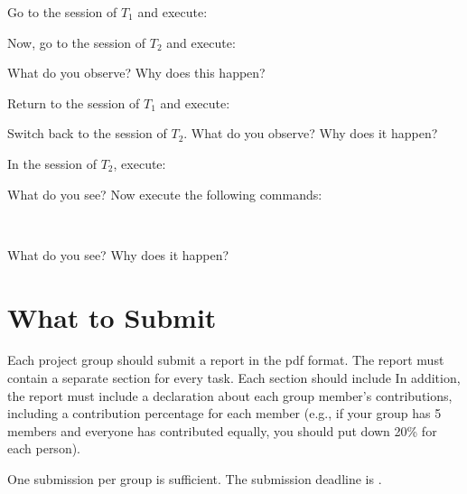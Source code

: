 \vgap

\noindent {}

\vgap

\noindent Go to the session of $T_1$ and execute:

\vgap

\noindent {}

\vgap

\noindent Now, go to the session of $T_2$ and execute:

\vgap

\noindent {}

\vgap

\noindent What do you observe? Why does this happen?

\vgap

\noindent Return to the session of $T_1$ and execute:

\vgap

\noindent {}

\vgap

\noindent Switch back to the session of $T_2$. What do you observe? Why does it happen?

\vgap

\noindent In the session of $T_2$, execute:

\vgap

\noindent {}

\vgap

\noindent What do you see? Now execute the following commands:

\vgap

\noindent {}  \\
\noindent {}

\vgap

\noindent What do you see? Why does it happen?

\section{What to Submit}

Each project group should submit a report in the pdf format. The report must contain a separate section for every task. Each section should include
In addition, the report must include a declaration about each group member's contributions, including a contribution percentage for each member (e.g., if your group has 5 members and everyone has contributed equally, you should put down 20\% for each person).

\vgap

One submission per group is sufficient. The submission deadline is .



